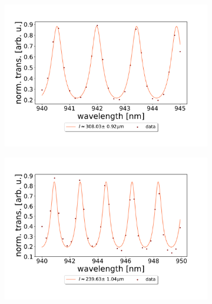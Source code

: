 \begin{figure}[h!]
\begin{subfigure}[b]{0.49\textwidth}
    \end{subfigure}
    \begin{subfigure}[b]{0.49\textwidth}
        \includegraphics[width=\textwidth]{figures/results/double fano fits/320um_M3:M5_FSR_scan.pdf}
        \caption{}
        \label{fig:320um_M3:M5_FSR_scan}
    \end{subfigure}
    \begin{subfigure}[b]{0.49\textwidth}
        \includegraphics[width=\textwidth]{figures/results/double fano fits/250um_M3:M5_FSR_scan.pdf}
        \caption{}
        \label{fig:250um_M3:M5_FSR_scan}
    \end{subfigure}
    \begin{subfigure}[b]{0.49\textwidth}

\end{subfigure}
\end{figure}
